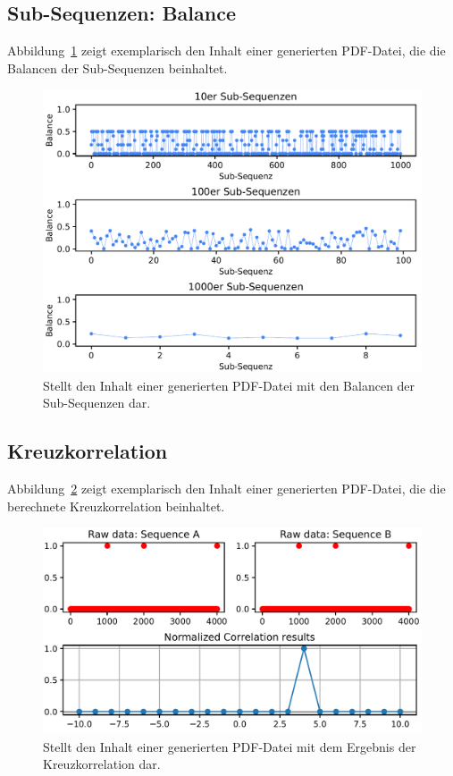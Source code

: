 \newpage
\subsection{Sub-Sequenzen: Balance}
Abbildung~\ref{fig:result:sub:bal} zeigt exemplarisch den Inhalt einer generierten PDF-Datei, die die Balancen der Sub-Sequenzen beinhaltet.
\begin{figure}[H]
	\includegraphics[width=\linewidth]{attachements/python/balance.PNG}
	\caption[Anhang: Balance der Sub-Sequenzen]{Stellt den Inhalt einer generierten PDF-Datei mit den Balancen der Sub-Sequenzen dar\footnotemark.}
	\label{fig:result:sub:bal}
\end{figure}
\newpage
\subsection{Kreuzkorrelation}
Abbildung~\ref{fig:result:crosscorr} zeigt exemplarisch den Inhalt einer generierten PDF-Datei, die die berechnete Kreuzkorrelation beinhaltet.
\begin{figure}[H]
	\includegraphics[width=\linewidth]{attachements/python/cross_correlation.PNG}
	\caption[Anhang: Ergebnis der Kreuzkorrelation]{Stellt den Inhalt einer generierten PDF-Datei mit dem Ergebnis der Kreuzkorrelation dar\footnotemark.}
	\label{fig:result:crosscorr}
\end{figure}

